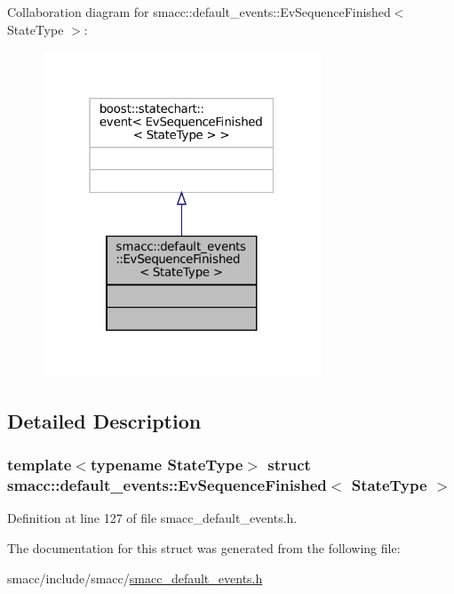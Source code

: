 Collaboration diagram for smacc\+:\+:default\+\_\+events\+:\+:Ev\+Sequence\+Finished$<$ State\+Type $>$\+:
\nopagebreak
\begin{figure}[H]
\begin{center}
\leavevmode
\includegraphics[width=235pt]{structsmacc_1_1default__events_1_1EvSequenceFinished__coll__graph}
\end{center}
\end{figure}


\subsection{Detailed Description}
\subsubsection*{template$<$typename State\+Type$>$\newline
struct smacc\+::default\+\_\+events\+::\+Ev\+Sequence\+Finished$<$ State\+Type $>$}



Definition at line 127 of file smacc\+\_\+default\+\_\+events.\+h.



The documentation for this struct was generated from the following file\+:\begin{DoxyCompactItemize}
\item 
smacc/include/smacc/\hyperlink{smacc__default__events_8h}{smacc\+\_\+default\+\_\+events.\+h}\end{DoxyCompactItemize}
